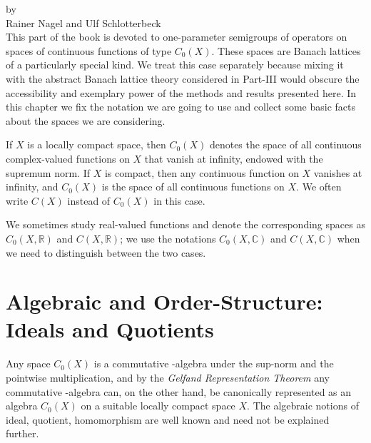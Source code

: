 \label{chap:b1}%
\thispagestyle{empty}
{\Large
\vspace*{-.75cm}
by \\[.25em]
Rainer Nagel and Ulf Schlotterbeck
\vspace{.75cm}
\\
}
This part of the book is devoted to one-parameter semigroups of operators on spaces of continuous functions of type $C_{0}(X)$.
These spaces are Banach lattices of a particularly special kind.
We treat this case separately because mixing it with the abstract Banach lattice theory considered in Part-III would obscure the accessibility and exemplary power of the methods and results presented here.
In this chapter we fix the notation we are going to use and collect some basic facts about the spaces we are considering.

If\/ $X$ is a locally compact space, then $C_{0}(X)$ denotes the space of all continuous complex-valued functions on $X$ that vanish at infinity, endowed with the supremum norm.
If\/ $X$ is compact, then any continuous function on $X$ vanishes at infinity, and $C_{0}(X)$ is the space of all continuous functions on $X$.
We often write $C(X)$ instead of\/ $C_{0}(X)$ in this case.

We sometimes study real-valued functions and denote the corresponding spaces as $C_{0}(X,\mathbb{R})$ and $C(X,\mathbb{R})$; we use the notations $C_{0}(X,\mathbb{C})$ and $C(X,\mathbb{C})$ when we need to distinguish between the two cases.
\section{Algebraic and Order-Structure: Ideals and Quotients}\label{sec:b1-1}%
Any space $C_{0}(X)$ is a commutative \CA-algebra under the sup-norm and the pointwise multiplication, and by the \emph{Gelfand Representation Theorem} any commutative \CA-algebra can, on the other hand, be canonically represented as an algebra $C_{0}(X)$ on a suitable locally compact space $X$.
The algebraic notions of ideal, quotient, homomorphism are well known and need not be explained further.

